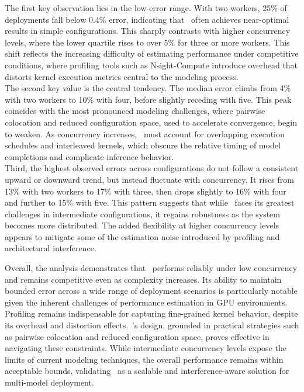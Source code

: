 The first key observation lies in the low-error range. With two workers, 25\% of deployments fall below 0.4\% error, indicating that~\roomie{} often achieves near-optimal results in simple configurations. This sharply contrasts with higher concurrency levels, where the lower quartile rises to over 5\% for three or more workers. This shift reflects the increasing difficulty of estimating performance under competitive conditions, where profiling tools such as Nsight-Compute introduce overhead that distorts kernel execution metrics central to the modeling process.\\
The second key value is the central tendency. The median error climbs from 4\% with two workers to 10\% with four, before slightly receding with five. This peak coincides with the most pronounced modeling challenges, where pairwise colocation and reduced configuration space, used to accelerate convergence, begin to weaken. As concurrency increases,~\roomie{} must account for overlapping execution schedules and interleaved kernels, which obscure the relative timing of model completions and complicate inference behavior.\\
Third, the highest observed errors across configurations do not follow a consistent upward or downward trend, but instead fluctuate with concurrency. It rises from 13\% with two workers to 17\% with three, then drops slightly to 16\% with four and further to 15\% with five. This pattern suggests that while~\roomie{} faces its greatest challenges in intermediate configurations, it regains robustness as the system becomes more distributed. The added flexibility at higher concurrency levels appears to mitigate some of the estimation noise introduced by profiling and architectural interference.

Overall, the analysis demonstrates that~\roomie{} performs reliably under low concurrency and remains competitive even as complexity increases. Its ability to maintain bounded error across a wide range of deployment scenarios is particularly notable given the inherent challenges of performance estimation in GPU environments. Profiling remains indispensable for capturing fine-grained kernel behavior, despite its overhead and distortion effects.~\roomie's design, grounded in practical strategies such as pairwise colocation and reduced configuration space, proves effective in navigating these constraints. While intermediate concurrency levels expose the limits of current modeling techniques, the overall performance remains within acceptable bounds, validating~\roomie{} as a scalable and interference-aware solution for multi-model deployment.

